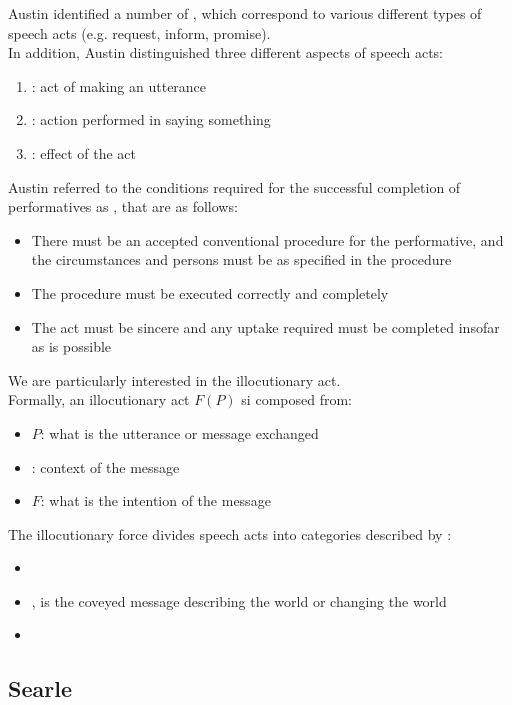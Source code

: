 Austin identified a number of , which correspond to various different types of speech acts (e.g. request, inform, promise).\\
In addition, Austin distinguished three different aspects of speech acts:
\begin{enumerate}
\item {}: act of making an utterance
\item {}: action performed in saying something
\item {}: effect of the act
\end{enumerate}
Austin referred to the conditions required for the successful completion of performatives as , that are as follows:
\begin{itemize}
\item There must be an accepted conventional procedure for the performative, and the circumstances and persons must be as specified in the procedure
\item The procedure must be executed correctly and completely
\item The act must be sincere and any uptake required must be completed insofar as is possible
\end{itemize}

We are particularly interested in the illocutionary act.\\ Formally, an illocutionary act $F(P)$ si composed from:
\begin{itemize}
\item {} $P$: what is the utterance or message exchanged
\item {}: context of the message
\item {} $F$: what is the intention of the message
\end{itemize}


The illocutionary force divides speech acts into categories described by :
\begin{itemize}
\item {} 
\item {}, is the coveyed message describing the world or changing the world
\item {}
 \end{itemize}
\subsection{Searle}

